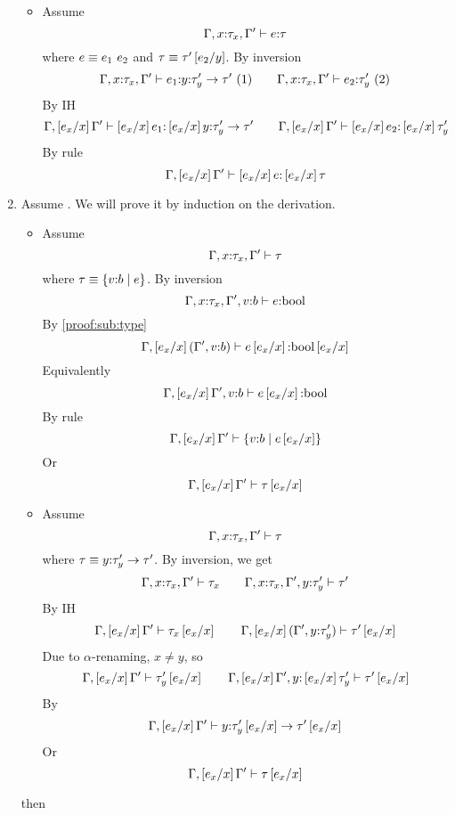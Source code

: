 \begin{enumerate}
\begin{itemize}
\item\rtapp
Assume
	$$\hastype{\Gamma, x\colon\tau_x, \Gamma'}{e}{\tau}$$
where $e\equiv\eapp{e_1}{e_2}$ and $\tau\equiv\tau'\sub{y}{e_2}$.
By inversion
	$$
	\hastype{\Gamma, x\colon\tau_x, \Gamma'}{e_1}{\tfun{y}{\tau'_y}{\tau'}}\ (1)\qquad
	\hastype{\Gamma, x\colon\tau_x, \Gamma'}{e_2}{{\tau'_y}}\ (2)
	$$
By IH 
	$$
	\hastype{\Gamma,\sub{x}{e_x} \Gamma'}{\sub{x}{e_x}e_1}{\sub{x}{e_x}\tfun{y}{\tau'_y}{\tau'}} \qquad
	\hastype{\Gamma,\sub{x}{e_x} \Gamma'}{\sub{x}{e_x}e_2}{\sub{x}{e_x}{\tau'_y}}
	$$
	By rule \rtapp
	$$
	\hastype{\Gamma,\sub{x}{e_x} \Gamma'}{\sub{x}{e_x}e}{\sub{x}{e_x}\tau}
	$$
\end{itemize}
\item \label{proof:sub:wf}
Assume .
We will prove it by induction on the derivation.
\begin{itemize}
\item \rwbase
Assume 
$$\iswellformed{\Gamma, x\colon\tau_x, \Gamma'}{\tau}$$
where $\tau\equiv\tref{v}{b}{e}$.
By inversion
$$\hastype{\Gamma, x\colon\tau_x, \Gamma',v\colon b}{e}{\tbool}$$
By \ref{proof:sub:type}
$$\hastype{\Gamma, \sub{x}{e_x}(\Gamma',v\colon b)}{e\sub{x}{e_x}}{\tbool\sub{x}{e_x}}$$
Equivalently
$$\hastype{\Gamma, \sub{x}{e_x}\Gamma',v\colon b}{e\sub{x}{e_x}}{\tbool}$$
By rule \rwbase
$$\iswellformed{\Gamma, \sub{x}{e_x}\Gamma'}{\tref{v}{b}{e\sub{x}{e_x}}}$$
Or 
$$\iswellformed{\Gamma, \sub{x}{e_x}\Gamma'}{\tau\sub{x}{e_x}}$$
\item \rwfun
Assume
$$\iswellformed{\Gamma, x\colon\tau_x, \Gamma'}{\tau}$$
where $\tau\equiv \tfun{y}{\tau'_y}{\tau'}$.
By inversion, we get
$$
	\iswellformed{\Gamma, x\colon\tau_x, \Gamma'}{\tau_x} \qquad
	\iswellformed{\Gamma, x\colon\tau_x, \Gamma', y \colon \tau'_y}{\tau'}
$$
By IH
$$
	\iswellformed{\Gamma, \sub{x}{e_x} \Gamma'}{\tau_x\sub{x}{e_x}}\qquad
	\iswellformed{\Gamma, \sub{x}{e_x}(\Gamma', y \colon \tau'_y)}{\tau'\sub{x}{e_x}}
$$
Due to $\alpha$-renaming, $x \neq y$, so
$$
	\iswellformed{\Gamma, \sub{x}{e_x} \Gamma'}{\tau'_y\sub{x}{e_x}}\qquad
	\iswellformed{\Gamma, \sub{x}{e_x}\Gamma', y \colon \sub{x}{e_x}\tau'_y}{\tau'\sub{x}{e_x}}
$$
By \rwfun
$$
	\iswellformed{\Gamma, \sub{x}{e_x} \Gamma'}{\tfun{y}{\tau'_y\sub{x}{e_x}}{\tau'\sub{x}{e_x}}}
$$
Or
$$
	\iswellformed{\Gamma, \sub{x}{e_x} \Gamma'}{\tau\sub{x}{e_x}}
$$
\end{itemize}

	then
\end{enumerate}
